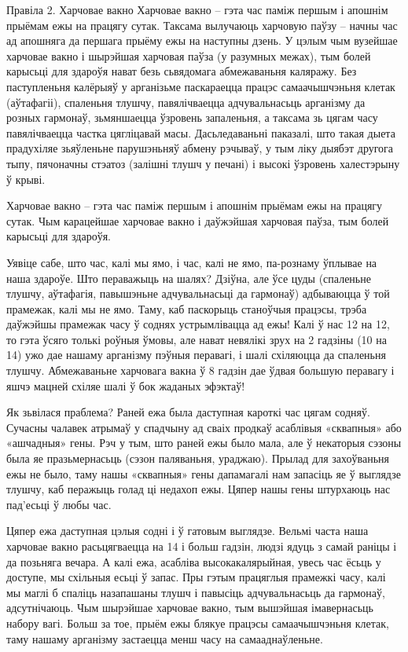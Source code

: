 Правіла 2. Харчовае вакно
Харчовае вакно – гэта час паміж першым і апошнім прыёмам ежы на працягу сутак. Таксама вылучаюць харчовую паўзу – начны час ад апошняга да першага прыёму ежы на наступны дзень. У цэлым чым вузейшае харчовае вакно і шырэйшая харчовая паўза (у разумных межах), тым болей карысьці для здароўя нават безь сьвядомага абмежаваньня каляражу. Без паступленьня калёрыяў у арганізьме паскараецца працэс самаачышчэньня клетак (аўтафагіі), спаленьня тлушчу, павялічваецца адчувальнасьць арганізму да розных гармонаў, зьмяншаецца ўзровень запаленьня, а таксама зь цягам часу павялічваецца частка цягліцавай масы. Дасьледаваньні паказалі, што такая дыета прадухіляе зьяўленьне парушэньняў абмену рэчываў, у тым ліку дыябэт другога тыпу, пячоначны стэатоз (залішні тлушч у печані) і высокі ўзровень халестэрыну ў крыві.

Харчовае вакно – гэта час паміж першым і апошнім прыёмам ежы на працягу сутак. Чым карацейшае харчовае вакно і даўжэйшая харчовая паўза, тым болей карысьці для здароўя.

Уявіце сабе, што час, калі мы ямо, і час, калі не ямо, па-рознаму ўплывае на наша здароўе. Што пераважыць на шалях? Дзіўна, але ўсе цуды (спаленьне тлушчу, аўтафагія, павышэньне адчувальнасьці да гармонаў) адбываюцца ў той прамежак, калі мы не ямо. Таму, каб паскорыць станоўчыя працэсы, трэба даўжэйшы прамежак часу ў соднях устрымлівацца ад ежы! Калі ў нас 12 на 12, то гэта ўсяго толькі роўныя ўмовы, але нават невялікі зрух на 2 гадзіны (10 на 14) ужо дае нашаму арганізму пэўныя перавагі, і шалі схіляюцца да спаленьня тлушчу. Абмежаваньне харчовага вакна ў 8 гадзін дае ўдвая большую перавагу і яшчэ мацней схіляе шалі ў бок жаданых эфэктаў!

Як зьвілася праблема?
Раней ежа была даступная кароткі час цягам содняў.
Сучасны чалавек атрымаў у спадчыну ад сваіх продкаў асаблівыя «сквапныя» або «ашчадныя» гены. Рэч у тым, што раней ежы было мала, але ў некаторыя сэзоны была яе празьмернасьць (сэзон паляваньня, ураджаю). Прылад для захоўваньня ежы не было, таму нашы «сквапныя» гены дапамагалі нам запасіць яе ў выглядзе тлушчу, каб перажыць голад ці недахоп ежы. Цяпер нашы гены штурхаюць нас пад'есьці ў любы час.

Цяпер ежа даступная цэлыя содні і ў гатовым выглядзе.
Вельмі часта наша харчовае вакно расьцягваецца на 14 і больш гадзін, людзі ядуць з самай раніцы і да позьняга вечара. А калі ежа, асабліва высокакалярыйная, увесь час ёсьць у доступе, мы схільныя есьці ў запас. Пры гэтым працяглыя прамежкі часу, калі мы маглі б спаліць назапашаны тлушч і павысіць адчувальнасьць да гармонаў, адсутнічаюць. Чым шырэйшае харчовае вакно, тым вышэйшая імавернасьць набору вагі. Больш за тое, прыём ежы блякуе працэсы самаачышчэньня клетак, таму нашаму арганізму застаецца менш часу на самааднаўленьне.

